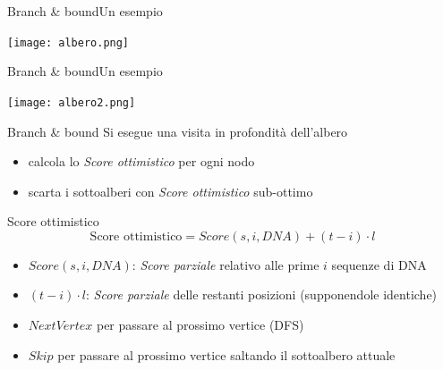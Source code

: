 	\begin{frame}{Branch \& bound}{Un esempio}
		\begin{center}
			\texttt{[image: albero.png]}
		\end{center}
	\end{frame}
	
	\begin{frame}{Branch \& bound}{Un esempio}
		\begin{center}
			\texttt{[image: albero2.png]}
		\end{center}
	\end{frame}
	
	\begin{frame}{Branch \& bound}
		Si esegue una visita in profondità dell'albero
		\begin{itemize}
			\item calcola lo \textit{Score ottimistico} per ogni nodo
			\item scarta i sottoalberi con \textit{Score ottimistico} sub-ottimo
		\end{itemize}
		\begin{block}{Score ottimistico}
			$$\mbox{Score ottimistico}=Score(s,i,DNA)+(t-i)\cdot l$$
			\begin{itemize}
				\item $Score(s,i,DNA)$: \textit{Score parziale} relativo alle prime $i$ sequenze di DNA
				\item $(t-i)\cdot l$: \textit{Score parziale} delle restanti posizioni (supponendole identiche)
			\end{itemize}
		\end{block}
		\begin{itemize}
			\item $NextVertex$ per passare al prossimo vertice (DFS)
			\item $Skip$ per passare al prossimo vertice saltando il sottoalbero attuale
		\end{itemize}
	\end{frame}
	
